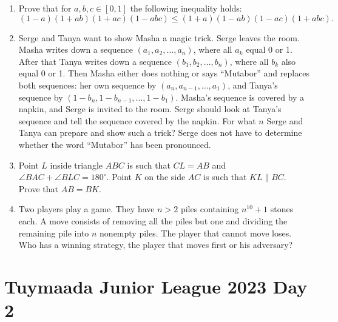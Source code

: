 \documentclass[12pt]{scrartcl}
\begin{document}
\begin{enumerate}[resume]
    \item[\textbf{1.}] Prove that for $a, b, c \in [0, 1]$ the following inequality holds:
    \[ (1 - a)(1 + ab)(1 + ac)(1 - abc) \leqslant (1 + a)(1 - ab)(1 - ac)(1 + abc). \]
    

    \item[\textbf{2.}] Serge and Tanya want to show Masha a magic trick. Serge leaves the room. Masha writes down a sequence $(a_1, a_2, \dots, a_n)$, where all $a_k$ equal 0 or 1. After that Tanya writes down a sequence $(b_1, b_2, \dots, b_n)$, where all $b_k$ also equal 0 or 1. Then Masha either does nothing or says ``Mutabor'' and replaces both sequences: her own sequence by $(a_n, a_{n-1}, \dots, a_1)$, and Tanya's sequence by $(1 - b_n, 1 - b_{n-1}, \dots, 1 - b_1)$. Masha's sequence is covered by a napkin, and Serge is invited to the room. Serge should look at Tanya's sequence and tell the sequence covered by the napkin. For what $n$ Serge and Tanya can prepare and show such a trick? Serge does not have to determine whether the word ``Mutabor'' has been pronounced. 

    \item[\textbf{3.}] Point $L$ inside triangle $ABC$ is such that $CL = AB$ and $\angle BAC + \angle BLC = 180^{\circ}$. Point $K$ on the side $AC$ is such that $KL \parallel BC$. Prove that $AB = BK$. 

    \item[\textbf{4.}] Two players play a game. They have $n > 2$ piles containing $n^{10} + 1$ stones each. A move consists of removing all the piles but one and dividing the remaining pile into $n$ nonempty piles. The player that cannot move loses. Who has a winning strategy, the player that moves first or his adversary? 
\end{enumerate}

\section{Tuymaada Junior League 2023 Day 2}
\end{document}
